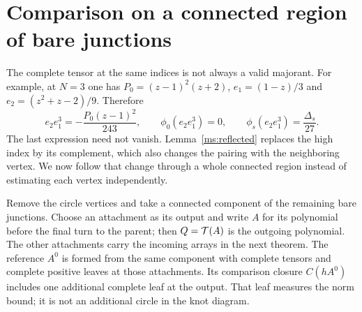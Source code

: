 \section{Comparison on a connected region of bare junctions}\label{ms:components}
The complete tensor at the same indices is not always a valid
majorant. For example, at $N=3$ one has
$P_0=(z-1)^2(z+2)$, $e_1=(1-z)/3$ and
$e_2=(z^2+z-2)/9$. Therefore
\[
 e_2e_1^3=-\frac{P_0(z-1)^2}{243},\qquad
 \phi_0(e_2e_1^3)=0,\qquad
 \phi_s(e_2e_1^3)=\frac{\Delta_s}{27}.
\]
The last expression need not vanish. Lemma~\ref{ms:reflected}
replaces the high index by its complement, which also changes the
pairing with the neighboring vertex. We now follow that change
through a whole connected region instead of estimating each vertex
independently.

Remove the circle vertices and take a connected component of the
remaining bare junctions. Choose an attachment as its output and
write $A$ for its polynomial before the final turn to the parent;
then $Q=\mathcal T(A)$ is the outgoing polynomial. The other attachments
carry the incoming arrays in the next theorem. The reference $A^0$
is formed from the same component with complete tensors and complete
positive leaves at those attachments. Its comparison closure
$C(hA^0)$ includes one additional complete leaf at the output.
That leaf measures the norm bound; it is not an additional circle
in the knot diagram.

